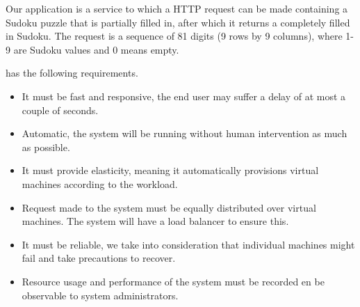 Our application is a service to which a HTTP request can be made containing a Sudoku puzzle that is partially filled in, after which it returns a completely filled in Sudoku.
The request is a sequence of 81 digits (9 rows by 9 columns), where 1-9 are Sudoku values and 0 means empty. 

\appName has the following requirements.
\begin{itemize}
	\item It must be fast and responsive, the end user may suffer a delay of at most a couple of seconds.
	\item Automatic, the system will be running without human intervention as much as possible.
	\item It must provide elasticity, meaning it automatically provisions virtual machines according to the workload.
	\item Request made to the system must be equally distributed over virtual machines. The system will have a load balancer to ensure this.
	\item It must be reliable, we take into consideration that individual machines might fail and take precautions to recover.
	\item Resource usage and performance of the system must be recorded en be observable to system administrators.
\end{itemize}
